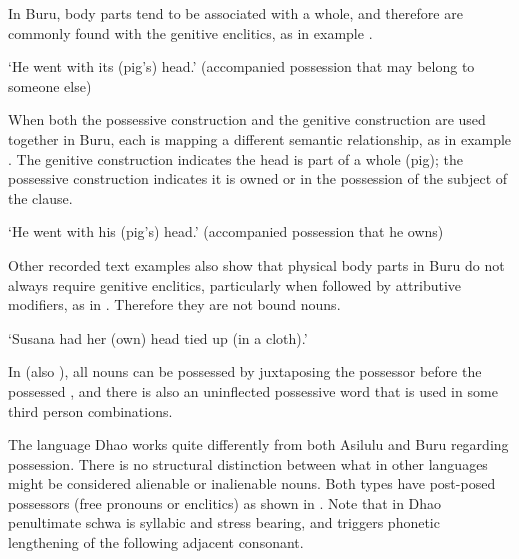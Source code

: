 In Buru, body parts tend to be associated with a whole,
and therefore are commonly found with the genitive enclitics,
as in example .

\begin{exe}
			\glt	‘He went with its (pig’s) head.’
						(accompanied possession that may belong to someone else)
						\label{ex:02-12}
\end{exe}

When both the possessive construction
and the genitive construction are used together in Buru,
each is mapping a different semantic relationship,
as in example .
The genitive construction indicates the head is part of a whole
(pig); the possessive construction indicates it is owned or in
the possession of the subject of the clause.

\begin{exe}
			\glt	‘He went with his (pig’s) head.’
						(accompanied possession that he owns)
						\label{ex:02-13}
\end{exe}

Other recorded text examples also show that physical body parts
in Buru do not always require genitive enclitics,
particularly when followed by attributive modifiers, as in .
Therefore they are not bound nouns.

\begin{exe}
			\glt	‘Susana had her (own) head tied up (in a cloth).’
						\label{ex:02-14}
\end{exe}

In  (also ),
all nouns can be possessed by juxtaposing the possessor before
the possessed \citep[280--293]{Bloyd2020},
and there is also an uninflected possessive word that is used
in some third person combinations.

The  language Dhao \citep{Grimes2010a} works
quite differently from both Asilulu
and Buru regarding possession.
There is no structural distinction between what in other languages
might be considered alienable or inalienable nouns.
Both types have post-posed possessors (free pronouns or enclitics)
as shown in .
Note that in Dhao penultimate schwa is syllabic
and stress bearing, and triggers phonetic lengthening of the following adjacent consonant.

